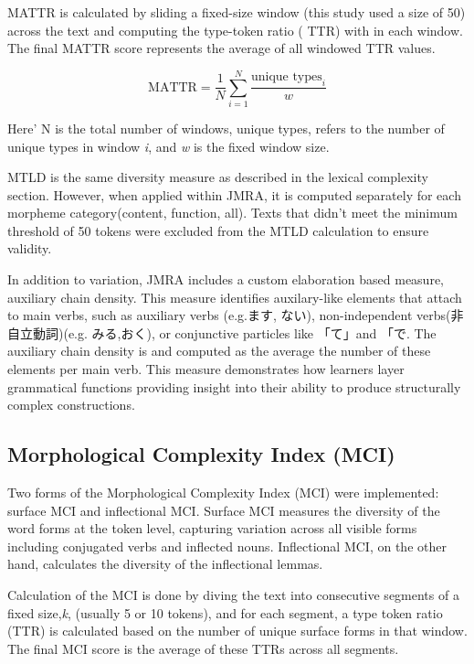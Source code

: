 MATTR is calculated by sliding a fixed-size window (this study used a size of 50) across the text and computing the
type-token ratio (
TTR) with in each window. The final MATTR score represents the average of all windowed TTR values.

\begin{equation}
    \text{MATTR} = \frac{1}{N} \sum_{i=1}^{N} \frac{\text{unique types}_i}{w}
\end{equation}

Here' N is the total number of windows, unique types, refers to the number of unique types in window \textit{i}, and
\textit{w} is
the
fixed window size.

MTLD is the same diversity measure as described in the lexical complexity section. However, when applied within
JMRA, it is computed separately for each morpheme category(content, function, all). Texts that didn't meet the
minimum threshold of 50 tokens were excluded from the MTLD calculation to ensure validity.

In addition to variation, JMRA includes a custom elaboration based measure, auxiliary chain density. This measure identifies auxilary-like elements that attach to main verbs, such as
auxiliary verbs (e.g.ます, ない), non-independent verbs(非自立動詞)(e.g. みる,おく), or conjunctive particles like 「て」and 「で. The
auxiliary chain density is and
computed as the
average the
number of these elements per main verb. This measure demonstrates how learners layer grammatical functions providing insight into their ability to produce structurally complex constructions.

\subsection{Morphological Complexity Index (MCI)}

Two forms of the Morphological Complexity Index (MCI) were implemented:
surface
MCI and
inflectional MCI. Surface MCI measures the diversity of the word forms at the token level, capturing variation
across all visible forms including conjugated verbs and inflected nouns. Inflectional MCI, on the other hand,
calculates the diversity of
the inflectional lemmas.

Calculation of the MCI is done by diving the text into consecutive segments of a fixed size,\textit{k}, (usually 5
or 10
tokens), and for each segment, a type token ratio (TTR) is calculated based on the number of unique surface forms in
that window. The final MCI score is the average of these TTRs across all segments.

